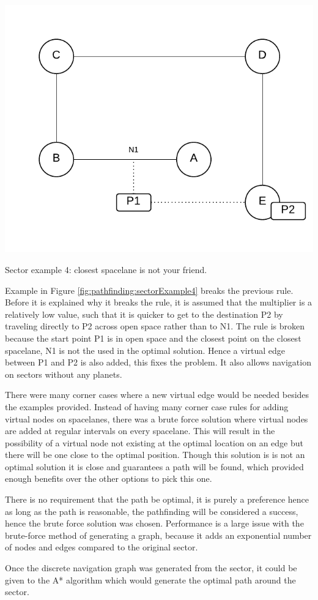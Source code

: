 \begin{marginfigure}
	\includegraphics{res/pathfinding/PathFindingSector4.pdf}
    \caption[Sector example 4: closest spacelane is not your friend]{Sector example 4: closest spacelane is not your friend.}
	\label{fig:pathfinding:sectorExample4}
\end{marginfigure}

Example in Figure \ref{fig:pathfinding:sectorExample4} breaks the previous rule.
Before it is explained why it breaks the rule, it is assumed that the multiplier is a relatively low value, such that it is quicker to get to the destination P2 by traveling directly to P2 across open space rather than to N1.
The rule is broken because the start point P1 is in open space and the closest point on the closest spacelane, N1 is not the used in the optimal solution.
Hence a virtual edge between P1 and P2 is also added, this fixes the problem.
It also allows navigation on sectors without any planets.

There were many corner cases where a new virtual edge would be needed besides the examples provided.
Instead of having many corner case rules for adding virtual nodes on spacelanes, there was a brute force solution where virtual nodes are added at regular intervals on every spacelane. 
This will result in the possibility of a virtual node not existing at the optimal location on an edge but there will be one close to the optimal position.
Though this solution is is not an optimal solution it is close and guarantees a path will be found, which provided enough benefits over the other options to pick this one.

There is no requirement that the path be optimal, it is purely a preference hence as long as the path is reasonable, the pathfinding will be considered a success, hence the brute force solution was chosen.
Performance is a large issue with the brute-force method of generating a graph, because it adds an exponential number of nodes and edges compared to the original sector. 

Once the discrete navigation graph was generated from the sector, it could be given to the A* algorithm which would generate the optimal path around the sector.


